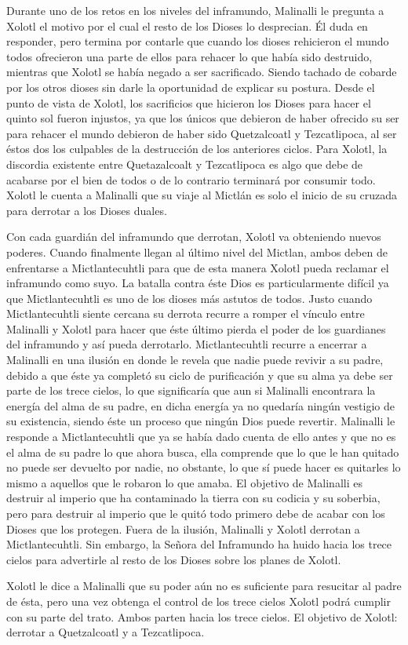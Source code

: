 \documentclass[11pt,letterpaper]{article}
\begin{document}
Durante uno de los retos en los niveles del inframundo, Malinalli le pregunta a Xolotl el motivo por el cual el resto de los Dioses lo desprecian. Él duda en responder, pero termina por contarle que cuando los dioses rehicieron el mundo todos ofrecieron una parte de ellos para rehacer lo que había sido destruido, mientras que Xolotl se había negado a ser sacrificado. Siendo tachado de cobarde por los otros dioses sin darle la oportunidad de explicar su postura. Desde el punto de vista de Xolotl, los sacrificios que hicieron los Dioses para hacer el quinto sol fueron injustos, ya que los únicos que debieron de haber ofrecido su ser para rehacer el mundo debieron de haber sido Quetzalcoatl y Tezcatlipoca, al ser éstos dos los culpables de la destrucción de los anteriores ciclos. Para Xolotl, la discordia existente entre Quetazalcoalt y Tezcatlipoca es algo que debe de acabarse por el bien de todos o de lo contrario terminará por consumir todo. Xolotl le cuenta a Malinalli que su viaje al Mictlán es solo el inicio de su cruzada para derrotar a los Dioses duales.
\\
\par
Con cada guardián del inframundo que derrotan, Xolotl va obteniendo nuevos poderes. Cuando finalmente llegan al último nivel del Mictlan, ambos deben de enfrentarse a Mictlantecuhtli para que de esta manera Xolotl pueda reclamar el inframundo como suyo. La batalla contra éste Dios es particularmente difícil ya que Mictlantecuhtli es uno de los dioses más astutos de todos. Justo cuando Mictlantecuhtli siente cercana su derrota recurre a romper el vínculo entre Malinalli y Xolotl para hacer que éste último pierda el poder de los guardianes del inframundo y así pueda derrotarlo. Mictlantecuhtli recurre a encerrar a Malinalli en una ilusión en donde le revela que nadie puede revivir a su padre, debido a que éste ya completó su ciclo de purificación y que su alma ya debe ser parte de los trece cielos, lo que significaría que aun si Malinalli encontrara la energía del alma de su padre, en dicha energía ya no quedaría ningún vestigio de su existencia, siendo éste un proceso que ningún Dios puede revertir. Malinalli le responde a Mictlantecuhtli que ya se había dado cuenta de ello antes y que no es el alma de su padre lo que ahora busca, ella comprende que lo que le han quitado no puede ser devuelto por nadie, no obstante, lo que sí puede hacer es quitarles lo mismo a aquellos que le robaron lo que amaba. El objetivo de Malinalli es destruir al imperio que ha contaminado la tierra con su codicia y su soberbia, pero para destruir al imperio que le quitó todo primero debe de acabar con los Dioses que los protegen. Fuera de la ilusión, Malinalli y Xolotl derrotan a Mictlantecuhtli. Sin embargo, la Señora del Inframundo ha huido hacia los trece cielos para advertirle al resto de los Dioses sobre los planes de Xolotl.
\\
\par
Xolotl le dice a Malinalli que su poder aún no es suficiente para resucitar al padre de ésta, pero una vez obtenga el control de los trece cielos Xolotl podrá cumplir con su parte del trato.  Ambos parten hacia los trece cielos.  El objetivo de Xolotl: derrotar a Quetzalcoatl y a Tezcatlipoca. 
   
\end{document}
